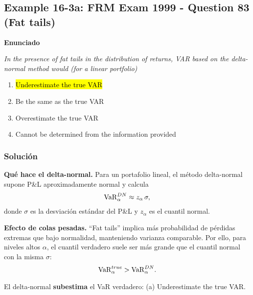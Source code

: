 ﻿\subsection{Example 16-3a: FRM Exam 1999 - Question 83 (Fat tails)}

\textbf{Enunciado}

\emph{In the presence of fat tails in the distribution of returns, VAR based on
the delta-normal method would (for a linear portfolio)}
\begin{enumerate}[label=\alph*.]
\item \hl{Underestimate the true VAR}
\item Be the same as the true VAR
\item Overestimate the true VAR
\item Cannot be determined from the information provided
\end{enumerate}

\subsubsection*{Solución}


\textbf{Qué hace el delta-normal. }Para un portafolio lineal, el método delta-normal supone P\&L aproximadamente normal y calcula
\[
\mathrm{VaR}_\alpha^{DN}\approx z_\alpha \,\sigma,
\]
donde \(\sigma\) es la desviación estándar del P\&L y \(z_\alpha\) es el cuantil normal.

\textbf{Efecto de colas pesadas. }``Fat tails'' implica más probabilidad de pérdidas extremas que bajo normalidad, manteniendo varianza comparable.
Por ello, para niveles altos \(\alpha\), el cuantil verdadero suele ser más grande que el cuantil normal con la misma \(\sigma\):
\[
\mathrm{VaR}_\alpha^{true} > \mathrm{VaR}_\alpha^{DN}.
\]


El delta-normal \textbf{subestima} el VaR verdadero:
(a) Underestimate the true VAR.










